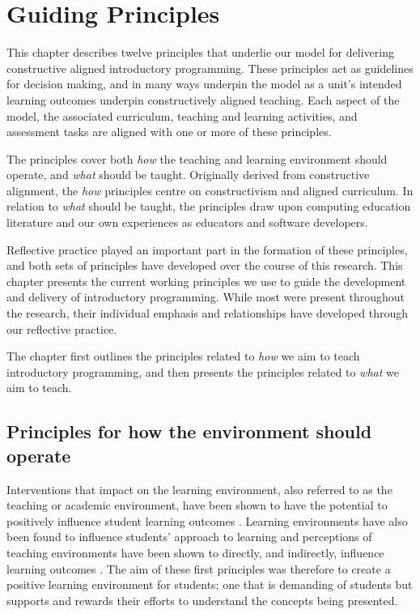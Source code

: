 
\chapter{Guiding Principles} %
\label{cha:guiding_principles}

\graphicspath{{Figures/CAApproach/}}

This chapter describes twelve principles that underlie our model for delivering constructive aligned introductory programming. These principles act as guidelines for decision making, and in many ways underpin the model as a unit's intended learning outcomes underpin constructively aligned teaching. Each aspect of the model, the associated curriculum, teaching and learning activities, and assessment tasks are aligned with one or more of these principles. 

The principles cover both \emph{how} the teaching and learning environment should operate, and \emph{what} should be taught. Originally derived from constructive alignment, the \emph{how} principles centre on constructivism and aligned curriculum. In relation to \emph{what} should be taught, the principles draw upon computing education literature and our own experiences as educators and software developers. 

Reflective practice played an important part in the formation of these principles, and both sets of principles have developed over the course of this research. This chapter presents the current working principles we use to guide the development and delivery of introductory programming. While most were present throughout the research, their individual emphasis and relationships have developed through our reflective practice. 

The chapter first outlines the principles related to \emph{how} we aim to teach introductory programming, and then presents the principles related to \emph{what} we aim to teach.



\section{Principles for how the environment should operate} %
\label{sub:principles_for_how_the_environment_should_operate}

Interventions that impact on the learning environment, also referred to as the teaching or academic environment, have been shown to have the potential to positively influence student learning outcomes \cite{Trigwell:1991}. Learning environments have also been found to influence students' approach to learning \cite{Entwistle:1990,Entwistle:1991,Kember:2007} and perceptions of teaching environments have been shown to directly, and indirectly, influence learning outcomes \cite{Meyer:1990,Lizzio:2002}. The aim of these first principles was therefore to create a positive learning environment for students; one that is demanding of students but supports and rewards their efforts to understand the concepts being presented. 

